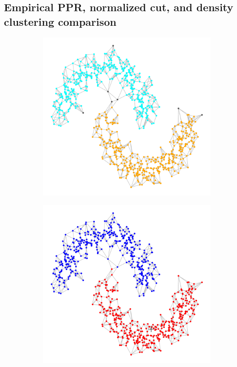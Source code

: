 \documentclass{article}
\newcommand{\1}{\mathbf{1}}
\theoremstyle{aldenthm}
\theoremstyle{aldenrmrk}
\begin{document}
\subsection{Empirical PPR, normalized cut, and density clustering comparison}

\begin{figure}
	\centering
	\begin{adjustbox}{minipage=\linewidth,scale=0.8}
	\begin{subfigure}{.24\linewidth}
		\includegraphics[width=\linewidth,scale = .5]{example2plots/row1_true_density_cluster}
		\caption{}
	\end{subfigure}
	\begin{subfigure}{.24\linewidth}
		\includegraphics[width=\linewidth]{example2plots/row1_ppr_cluster}

\end{subfigure}
\end{adjustbox}
\end{figure}
\end{document}
